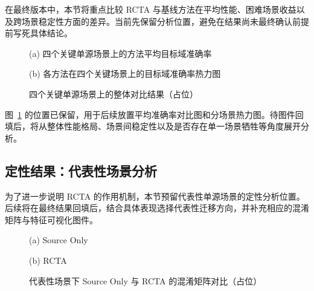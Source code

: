 \begin{table}[htbp]
\centering
\caption{RCTA 与 Source Only 及逐场景最强基线的比较（占位）}
\label{tab:rcta-vs-baselines}
\small
{}
\normalsize
\end{table}

在最终版本中，本节将重点比较 RCTA 与基线方法在平均性能、困难场景收益以及跨场景稳定性方面的差异。当前先保留分析位置，避免在结果尚未最终确认前提前写死具体结论。

\begin{figure}[htbp]
\centering
\begin{minipage}{0.49\textwidth}
\centering
{}
\par
\footnotesize (a) 四个关键单源场景上的方法平均目标域准确率
\end{minipage}
\hfill
\begin{minipage}{0.49\textwidth}
\centering
{}
\par
\footnotesize (b) 各方法在四个关键场景上的目标域准确率热力图
\end{minipage}
\caption{四个关键单源场景上的整体对比结果（占位）}
\label{fig:rcta-single-source-overview}
\end{figure}

图~\ref{fig:rcta-single-source-overview} 的位置已保留，用于后续放置平均准确率对比图和分场景热力图。待图件回填后，将从整体性能格局、场景间稳定性以及是否存在单一场景牺牲等角度展开分析。

\subsection{定性结果：代表性场景分析}
为了进一步说明 RCTA 的作用机制，本节预留代表性单源场景的定性分析位置。后续将在最终结果回填后，结合具体表现选择代表性迁移方向，并补充相应的混淆矩阵与特征可视化图件。

\begin{figure}[htbp]
\centering
\begin{minipage}{0.49\textwidth}
\centering
{}
\par
\footnotesize (a) Source Only
\end{minipage}
\hfill
\begin{minipage}{0.49\textwidth}
\centering
{}
\par
\footnotesize (b) RCTA
\end{minipage}
\caption{代表性场景下 Source Only 与 RCTA 的混淆矩阵对比（占位）}
\label{fig:rcta-confusion}
\end{figure}

